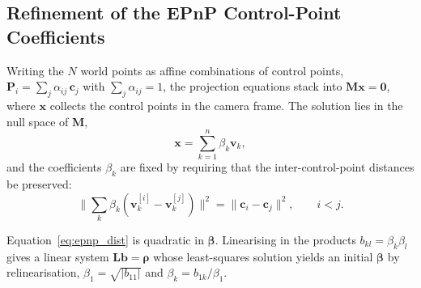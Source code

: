 %
%

\subsection{Refinement of the EPnP Control-Point Coefficients}
\label{sec:epnp_gn}

Writing the $N$ world points as affine combinations of control points,
$\mathbf{P}_i = \sum_{j} \alpha_{ij}\,\mathbf{c}_j$ with
$\sum_j \alpha_{ij} = 1$, the projection equations stack into
$\mathbf{M}\mathbf{x} = \mathbf{0}$, where $\mathbf{x}$ collects the control
points in the camera frame. The solution lies in the null space of
$\mathbf{M}$,
\begin{equation}
\mathbf{x} = \sum_{k=1}^{n} \beta_k \mathbf{v}_k ,
\label{eq:epnp_null}
\end{equation}
and the coefficients $\beta_k$ are fixed by requiring that the
inter-control-point distances be preserved:
\begin{equation}
\bigl\| \textstyle\sum_k \beta_k (\mathbf{v}_k^{[i]} - \mathbf{v}_k^{[j]}) \bigr\|^2
= \| \mathbf{c}_i - \mathbf{c}_j \|^2 ,
\qquad i < j .
\label{eq:epnp_dist}
\end{equation}

Equation~\eqref{eq:epnp_dist} is quadratic in $\boldsymbol{\beta}$. Linearising
in the products $b_{kl} = \beta_k \beta_l$ gives a linear system
$\mathbf{L}\mathbf{b} = \boldsymbol{\rho}$ whose least-squares solution yields
an initial $\boldsymbol{\beta}$ by relinearisation,
$\beta_1 = \sqrt{|b_{11}|}$ and $\beta_k = b_{1k}/\beta_1$.

